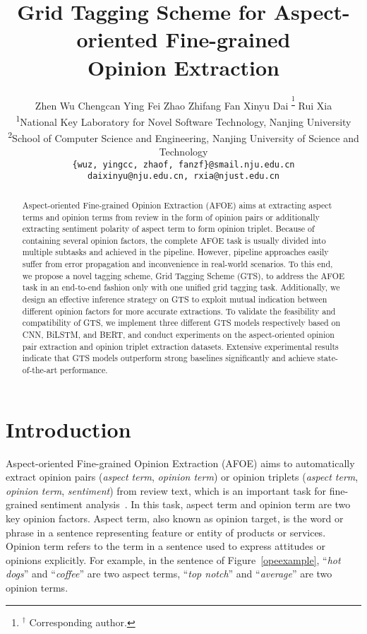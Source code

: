 \documentclass[11pt,a4paper]{article}
\title{Grid Tagging Scheme for Aspect-oriented Fine-grained\\ Opinion Extraction}
\author{
	Zhen Wu\textsuperscript{\normalfont 1 } \quad 
	Chengcan Ying\textsuperscript{\normalfont 1} \quad 
	Fei Zhao\textsuperscript{\normalfont 1} \quad 
	Zhifang Fan\textsuperscript{\normalfont 1} \quad 
	Xinyu Dai\textsuperscript{\normalfont 1 \thanks{$^\dagger$ Corresponding author.}} \quad 
	Rui Xia\textsuperscript{\normalfont 2} \\ 
	\textsuperscript{1}National Key Laboratory for Novel Software Technology, Nanjing University \\
	\textsuperscript{2}School of Computer Science and Engineering, Nanjing University of Science and Technology \\
	\texttt{\{wuz, yingcc, zhaof, fanzf\}@smail.nju.edu.cn} \\
	\texttt{daixinyu@nju.edu.cn, rxia@njust.edu.cn} 
}
\date{}
\begin{document}
\maketitle
\begin{abstract}
	Aspect-oriented Fine-grained Opinion Extraction (AFOE) aims at extracting aspect terms and opinion terms from review in the form of opinion pairs or additionally extracting sentiment polarity of aspect term to form opinion triplet. Because of containing several opinion factors, the complete AFOE task is usually divided into multiple subtasks and achieved in the pipeline. However, pipeline approaches easily suffer from error propagation and inconvenience in real-world scenarios. To this end, we propose a novel tagging scheme, Grid Tagging Scheme (GTS), to address the AFOE task in an end-to-end fashion only with one unified grid tagging task. Additionally, we design an effective inference strategy on GTS to exploit mutual indication between different opinion factors for more accurate extractions. To validate the feasibility and compatibility of GTS, we implement three different GTS models respectively based on CNN, BiLSTM, and BERT, and conduct experiments on the aspect-oriented opinion pair extraction and opinion triplet extraction datasets. Extensive experimental results indicate that GTS models outperform strong baselines significantly and achieve state-of-the-art performance.
	
\end{abstract}


\section{Introduction}
Aspect-oriented Fine-grained Opinion Extraction (AFOE) aims to automatically extract opinion pairs (\emph{aspect term}, \emph{opinion term}) or opinion triplets (\emph{aspect term}, \emph{opinion term}, \emph{sentiment}) from review text, which is an important task for fine-grained sentiment analysis~\cite{DBLP:journals/ftir/PangL07,DBLP:series/synthesis/2012Liu}. In this task, aspect term and opinion term are two key opinion factors. Aspect term, also known as opinion target, is the word or phrase in a sentence representing feature or entity of products or services. Opinion term refers to the term in a sentence used to express attitudes or opinions explicitly. For example, in the sentence of Figure~\ref{opeexample},  ``\emph{hot dogs}'' and ``\emph{coffee}'' are two aspect terms, ``\emph{top notch}'' and ``\emph{average}'' are two opinion terms.
\end{document}
